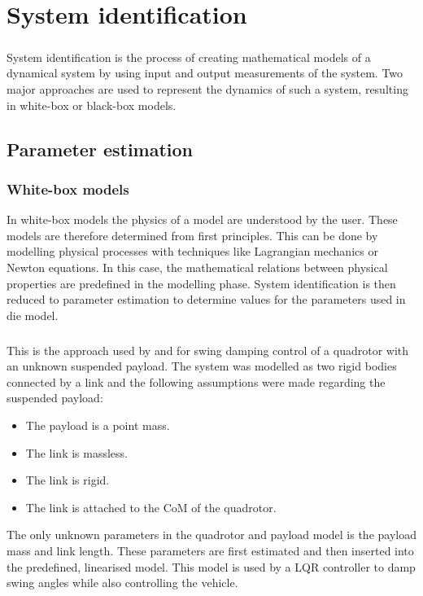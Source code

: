 \graphicspath{{system_id/fig/}}

\chapter{System identification}
\label{chap:system_id}

    \paragraph{}
    System identification is the process of creating mathematical models of a dynamical system by using input and output measurements of the system.
    Two major approaches are used to represent the dynamics of such a system, resulting in white-box or black-box models.

 
\section{Parameter estimation} 

    \subsection{White-box models}

        In white-box models the physics of a model are understood by the user.    
        These models are therefore determined from first principles.
        This can be done by modelling physical processes with techniques like Lagrangian mechanics or Newton equations.
        In this case, the mathematical relations between physical properties are predefined in the modelling phase.
        System identification is then reduced to parameter estimation to determine values for the parameters used in die model.
        
        \paragraph{} 
        This is the approach used by \cite{erasmus} and \cite{slabber} for swing damping control of a quadrotor with an unknown suspended payload.
        The system was modelled as two rigid bodies connected by a link and the following assumptions were made regarding the suspended payload:
        \begin{itemize}
            \item The payload is a point mass.
            \item The link is massless.
            \item The link is rigid.
            \item The link is attached to the CoM of the quadrotor.
        \end{itemize}
        The only unknown parameters in the quadrotor and payload model is the payload mass and link length.
        These parameters are first estimated and then inserted into the predefined, linearised model.
        This model is used by a LQR controller to damp swing angles while also controlling the vehicle.

